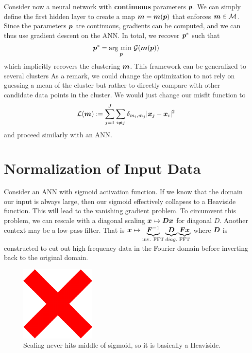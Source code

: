 Consider now a neural network with \textbf{continuous} parameters $\boldsymbol{p}$. We can simply define the first hidden layer to create a map $\boldsymbol{m} = \boldsymbol{m}(\boldsymbol{p})$ that enforces $\boldsymbol{m} \in \mathcal{M}$. Since the parameters $\boldsymbol{p}$ are continuous, gradients can be computed, and we can thus use gradient descent on the ANN. In total, we recover $\boldsymbol{p}^{*}$ such that
\begin{align*}
    \boldsymbol{p}^{*} = \underset{\boldsymbol{p}}{\textup{arg min }} \mathcal{G}(\boldsymbol{m}(\boldsymbol{p}))
\end{align*}
which implicitly recovers the clustering $\boldsymbol{m}$. This framework can be generalized to several clusters  As a remark, we could change the optimization to not rely on guessing a mean of the cluster but rather to directly compare with other candidate data points in the cluster. We would just change our misfit function to
\begin{align*}
    \mathcal{L}(\boldsymbol{m}) := \sum_{j=1}^{J} \sum_{i \neq j} \delta_{m_i,m_j} |\boldsymbol{x}_{j} - \boldsymbol{x}_{i}|^{2}
\end{align*}
and proceed similarly with an ANN.

\section{Normalization of Input Data}
Consider an ANN with sigmoid activation function. If we know that the domain our input is always large, then our sigmoid effectively collapses to a Heaviside function. This will lead to the vanishing gradient problem. To circumvent this problem, we can rescale with a diagonal scaling $\boldsymbol{x} \mapsto \boldsymbol{D} \boldsymbol{x}$ for diagonal $D$. Another context may be a low-pass filter. That is $\boldsymbol{x} \mapsto \underbrace{\boldsymbol{F}^{-1}}_{\textup{inv. FFT}} \underbrace{\boldsymbol{D}}_{diag.} \underbrace{\boldsymbol{F} \boldsymbol{x}}_{\textup{FFT}}$ where $\boldsymbol{D}$ is constructed to cut out high frequency data in the Fourier domain before inverting back to the original domain.
\begin{figure}
    \centering
    \includegraphics{images/x.pdf}
    \caption{Scaling never hits middle of sigmoid, so it is basically a Heaviside.}
    \label{fig:sigmoid}
\end{figure}

